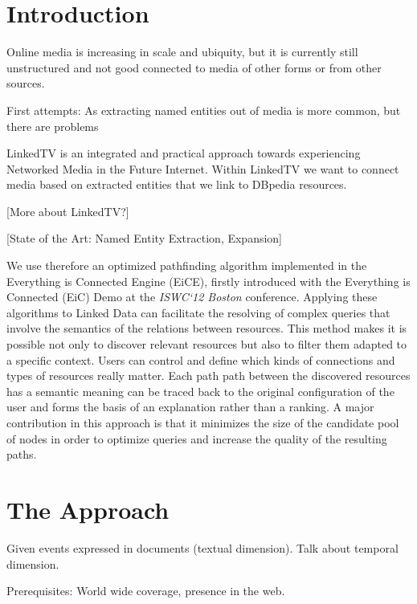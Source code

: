 \documentclass{acm_proc_article-sp}
\begin{document}

\section{Introduction}

Online media is increasing in scale and ubiquity, but it is currently still unstructured and not good connected to media of other forms or from other sources.

First attempts: As extracting named entities out of media is more common, but there are problems

LinkedTV is an integrated and practical approach towards experiencing Networked Media in the Future Internet. Within LinkedTV we want to connect media based on extracted entities that we link to DBpedia resources.

[More about LinkedTV?]

[State of the Art: Named Entity Extraction, Expansion]


We use therefore an optimized pathfinding algorithm \cite{de2013discovering} implemented in the Everything is Connected Engine (EiCE), firstly introduced with the Everything is Connected (EiC) Demo at the \emph{ISWC`12 Boston} conference.
Applying these algorithms to Linked Data can facilitate the resolving of complex queries that involve the semantics of the relations between resources. This method makes it is possible not only to discover relevant resources but also to filter them adapted to a specific context. Users can control and define which kinds of connections and types of resources really matter. Each path path between the discovered resources has a semantic meaning can be traced back to the original configuration of the user and
forms the basis of an explanation rather than a ranking. A major contribution in this approach is that it minimizes the size of the candidate pool of nodes in order to optimize queries and increase
the quality of the resulting paths.

\section{The Approach}

Given events expressed in documents (textual dimension). Talk about temporal dimension.

Prerequisites: World wide coverage, presence in the web.
\end{document}

